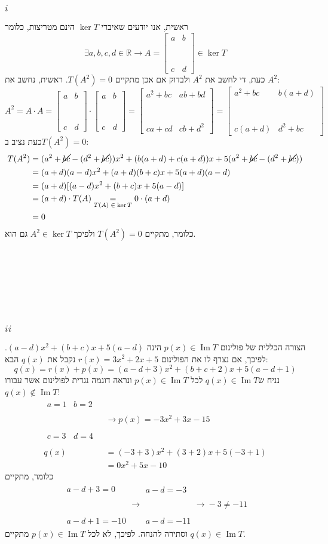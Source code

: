 \documentclass[11pt, oneside]{article}
\newcommand{\qed}{\R{$\blacksquare$}}
\newcommand{\br}{\\\\\\\\\\\\\\}
\newcommand{\opr}[1]{\xrightarrow[\text{#1}]{}}
\newcommand{\ueq}[1]{\underset{\text{#1}}{=}}
\newcommand{\mR}{\mathbb{R}}
\DeclareMathOperator{\Ima}{Im}
\newcommand{\fim}[4]{\begin{bmatrix}#1 & #2 \br #3 & #4\end{bmatrix}}
\begin{document}
\subsubsection{$i$}
ראשית, אנו יודעים שאיברי $\ker{T}$ הינם מטריצות, כלומר
\[
\exists a, b, c, d \in \mR \opr{} A = \fim{a}{b}{c}{d} \in \ker{T}
\]
כעת, די לחשב את $A^2$ ולבדוק אם אכן מתקיים $T(A^2) = 0$. ראשית, נחשב את $A^2$:
\[
A^2 =
A \cdot A =
\fim{a}{b}{c}{d} \cdot \fim{a}{b}{c}{d} =
\fim{a^2 + bc}{ab + bd}{ca + cd}{cb + d^2} =
\fim{a^2 + bc}{b(a + d)}{c(a + d)}{d^2 + bc}
\]
כעת נציב ב$T(A^2) = 0$:
\begin{align*}
T(A^2)
& = (a^2 + \cancel{bc} - (d^2 + \cancel{bc}))x^2 + (b(a + d) + c(a + d))x + 5(a^2 + \cancel{bc} - (d^2 + \cancel{bc}))\\
& = (a + d)(a - d)x^2 + (a + d)(b + c)x + 5(a + d)(a - d)\\
& = (a + d)[(a - d)x^2 + (b + c)x + 5(a - d)]\\
& = (a + d) \cdot T(A) \ueq{$T(A) \in \ker{T}$} 0 \cdot (a + d)\\
& = 0
\end{align*}
כלומר, מתקיים $T(A^2) = 0$ ולפיכך $A^2 \in \ker{T}$ גם הוא.
\br\qed

\subsubsection{$ii$}
הצורה הכללית של פולינום $p(x) \in \Ima{T}$ הינה $(a-d)x^2 + (b+c)x + 5(a-d)$. לפיכך, אם נצרף לו את הפולינום $r(x) = 3x^2 + 2x + 5$ נקבל את $q(x)$ הבא:
\[
q(x) = r(x) + p(x) = (a-d+3)x^2 + (b+c+2)x + 5(a-d+1)
\]
נניח ש$q(x) \in \Ima{T}$ לכל $p(x) \in \Ima{T}$ ונראה דוגמה נגדית לפולינום אשר עבורו $q(x) \not\in \Ima{T}$:
\begin{align*}
\begin{matrix}
a = 1 & b = 2\br
c = 3 & d = 4
\end{matrix}\;
& \opr{}
p(x) = -3x^2 + 3x - 15\\\\
q(x)
& = (-3 + 3)x^2 + (3 + 2)x + 5(-3+1)\\
& = 0x^2 + 5x - 10
\end{align*}
כלומר, מתקיים
\begin{align*}
\begin{matrix}
a - d + 3 = 0\br
a - d + 1 = -10
\end{matrix}
\opr{}
\begin{matrix}
a - d = -3\br
a - d = -11
\end{matrix}
\opr{}
-3 \neq -11
\end{align*}
וסתירה להנחה. לפיכך, לא לכל $p(x) \in \Ima{T}$ מתקיים $q(x) \in \Ima{T}$.
\br\qed
\clearpage
\end{document}
